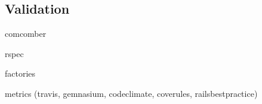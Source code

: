 \subsection{Validation}
comcomber

rspec

factories

metrics (travis, gemnasium, codeclimate, coverules, railsbestpractice)
